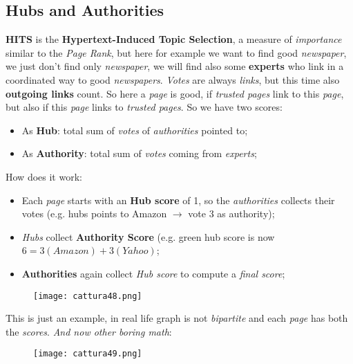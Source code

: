 \documentclass{article}
\begin{document}
\subsection{Hubs and Authorities}
\textbf{HITS} is the \textbf{Hypertext-Induced Topic Selection}, a measure of \emph{importance} similar to the \emph{Page Rank}, but here for example we want to find good \emph{newspaper}, we just don't find only \emph{newspaper}, we will find also some \textbf{experts} who link in a coordinated way to good \emph{newspapers}. \emph{Votes} are always \emph{links}, but this time also \textbf{outgoing links} count. So here a \emph{page} is good, if \emph{trusted pages} link to this \emph{page}, but also if this \emph{page} links to \emph{trusted pages}. So we have two scores:
\begin{itemize}
\item As \textbf{Hub}: total sum of \emph{votes} of \emph{authorities} pointed to;
\item As \textbf{Authority}: total sum of \emph{votes} coming from \emph{experts};
\end{itemize}
How does it work:
\begin{itemize}
\item Each \emph{page} starts with an \textbf{Hub score} of 1, so the \emph{authorities} collects their votes (e.g. hubs points to Amazon $\rightarrow$ vote 3 as authority);
\item \emph{Hubs} collect \textbf{Authority Score} (e.g. green hub score is now $6 = 3 (Amazon) + 3 (Yahoo)$;
\item \textbf{Authorities} again collect \emph{Hub score} to compute a \emph{final score};
\end{itemize}
\begin{figure}[H]
  \centering
  \texttt{[image: cattura48.png]}
\end{figure}
This is just an example, in real life graph is not \emph{bipartite} and each \emph{page} has both the \emph{scores}. \emph{And now other boring math}:
\begin{figure}[H]
  \centering
  \texttt{[image: cattura49.png]}
\end{figure}
\clearpage
\end{document}
